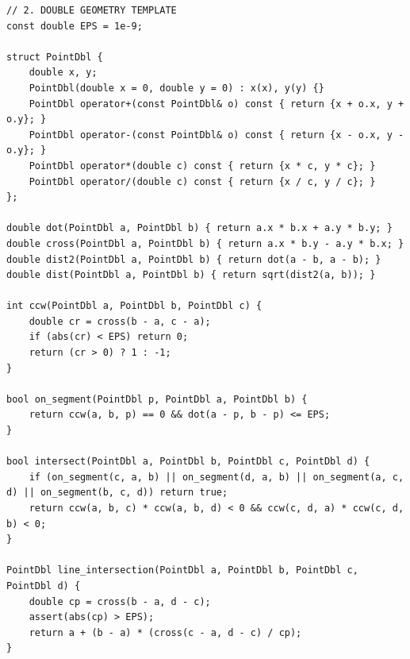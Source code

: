 \begin{lstlisting}
// 2. DOUBLE GEOMETRY TEMPLATE
const double EPS = 1e-9;

struct PointDbl {
    double x, y;
    PointDbl(double x = 0, double y = 0) : x(x), y(y) {}
    PointDbl operator+(const PointDbl& o) const { return {x + o.x, y + o.y}; }
    PointDbl operator-(const PointDbl& o) const { return {x - o.x, y - o.y}; }
    PointDbl operator*(double c) const { return {x * c, y * c}; }
    PointDbl operator/(double c) const { return {x / c, y / c}; }
};

double dot(PointDbl a, PointDbl b) { return a.x * b.x + a.y * b.y; }
double cross(PointDbl a, PointDbl b) { return a.x * b.y - a.y * b.x; }
double dist2(PointDbl a, PointDbl b) { return dot(a - b, a - b); }
double dist(PointDbl a, PointDbl b) { return sqrt(dist2(a, b)); }

int ccw(PointDbl a, PointDbl b, PointDbl c) {
    double cr = cross(b - a, c - a);
    if (abs(cr) < EPS) return 0;
    return (cr > 0) ? 1 : -1;
}

bool on_segment(PointDbl p, PointDbl a, PointDbl b) {
    return ccw(a, b, p) == 0 && dot(a - p, b - p) <= EPS;
}

bool intersect(PointDbl a, PointDbl b, PointDbl c, PointDbl d) {
    if (on_segment(c, a, b) || on_segment(d, a, b) || on_segment(a, c, d) || on_segment(b, c, d)) return true;
    return ccw(a, b, c) * ccw(a, b, d) < 0 && ccw(c, d, a) * ccw(c, d, b) < 0;
}

PointDbl line_intersection(PointDbl a, PointDbl b, PointDbl c, PointDbl d) {
    double cp = cross(b - a, d - c);
    assert(abs(cp) > EPS);
    return a + (b - a) * (cross(c - a, d - c) / cp);
}
\end{lstlisting}
